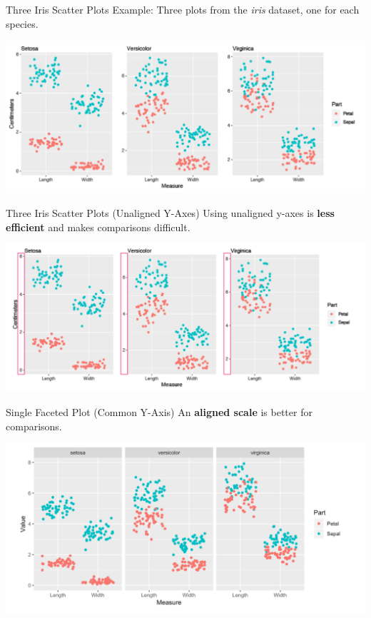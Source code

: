 \documentclass[
  ignorenonframetext,
]{beamer}
\begin{document}
\begin{frame}{Three Iris Scatter Plots}
\label{three-iris-scatter-plots}
Example: Three plots from the \emph{iris} dataset, one for each species.

\includegraphics{../images/im177.png}
\end{frame}

\begin{frame}{Three Iris Scatter Plots (Unaligned Y-Axes)}
\label{three-iris-scatter-plots-unaligned-y-axes}
Using unaligned y-axes is \textbf{less efficient} and makes comparisons
difficult.

\includegraphics{../images/im178.png}
\end{frame}

\begin{frame}{Single Faceted Plot (Common Y-Axis)}
\label{single-faceted-plot-common-y-axis}
An \textbf{aligned scale} is better for comparisons.

\includegraphics{../images/im179.png}
\end{frame}
\end{document}
